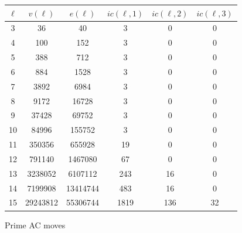 \begin{figure}
	\begin{tabular}{|c|c|c|c|c|c|}
		\hline
		$\ell$ & $v(\ell)$ & $e(\ell)$ & $ic(\ell,1)$ & $ic(\ell,2)$ & $ic(\ell,3)$ \\ \hline
		3 & 36 & 40 & 3 & 0 & 0 \\ \hline
		4 & 100 & 152 & 3 & 0 & 0 \\ \hline
		5 & 388 & 712 & 3 & 0 & 0 \\ \hline
		6 & 884 & 1528 & 3 & 0 & 0 \\ \hline
		7 & 3892 & 6984 & 3 & 0 & 0 \\ \hline
		8 & 9172 & 16728 & 3 & 0 & 0 \\ \hline
		9 & 37428 & 69752 & 3 & 0 & 0 \\ \hline
		10 & 84996 & 155752 & 3 & 0 & 0 \\ \hline
		11 & 350356 & 655928 & 19 & 0 & 0 \\ \hline
		12 & 791140 & 1467080 & 67 & 0 & 0 \\ \hline
		13 & 3238052 & 6107112 & 243 & 16 & 0 \\ \hline
		14 & 7199908 & 13414744 & 483 & 16 & 0 \\ \hline
        15 & 29243812 & 55306744 & 1819 & 136 & 32 \\ \hline
\end{tabular}
	\caption{Prime AC moves}
	\label{fig:prime_persistence}
\end{figure}


